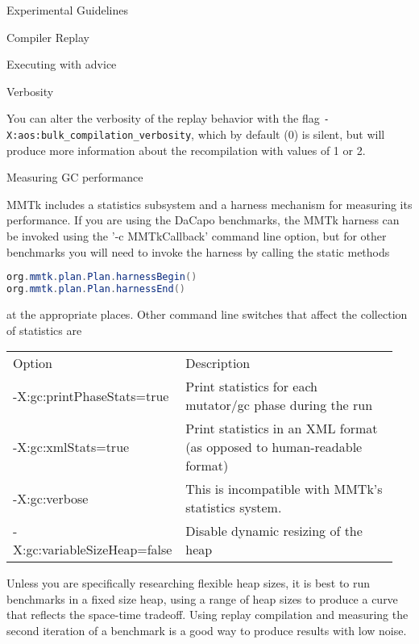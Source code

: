 \begin{section}{Experimental Guidelines}
\begin{subsection}{Compiler Replay}
\begin{subsubsection}{Executing with advice}
\end{subsubsection}

\begin{subsubsection}{Verbosity}

You can alter the verbosity of the replay behavior with the flag \texttt{-X:aos:bulk\_compilation\_verbosity}, which by default (0) is silent, but will produce more information about the recompilation with values of 1 or 2. 

\end{subsubsection}

\end{subsection}

\begin{subsection}{Measuring GC performance}

MMTk includes a statistics subsystem and a harness mechanism for measuring its performance.  If you are using the DaCapo benchmarks, the MMTk harness can be invoked using the '-c MMTkCallback' command line option, but for other benchmarks you will need to invoke the harness by calling the static methods

\begin{lstlisting}[language=Java]
org.mmtk.plan.Plan.harnessBegin()
org.mmtk.plan.Plan.harnessEnd()
\end{lstlisting}

at the appropriate places.  Other command line switches that affect the collection of statistics are

\begin{table}[h]
\centering
\begin{tabular}{p{0.4\linewidth}p{0.55\linewidth}}
Option & Description \\
-X:gc:printPhaseStats=true & Print statistics for each mutator/gc phase during the run \\
-X:gc:xmlStats=true & Print statistics in an XML format (as opposed to human-readable format) \\
-X:gc:verbose & This is incompatible with MMTk's statistics system. \\
-X:gc:variableSizeHeap=false & Disable dynamic resizing of the heap \\
\end{tabular}
\end{table}


Unless you are specifically researching flexible heap sizes, it is best to run benchmarks in a fixed size heap, using a range of heap sizes to produce a curve that reflects the space-time tradeoff.  Using replay compilation and measuring the second iteration of a benchmark is a good way to produce results with low noise.


\end{subsection}
\end{section}
